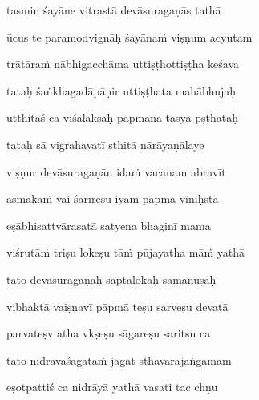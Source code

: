 tasmin śayāne vitrastā devāsuragaṇās tathā\thinspace{\dandab} \dontdisplaylinenum

ūcus te paramodvignāḥ śayāna\.m viṣṇum acyutam \veg\dontdisplaylinenum

trātāra\.m nābhigacchāma uttiṣṭhottiṣṭha keśava\thinspace{\dandab} \dontdisplaylinenum

tataḥ śaṅkhagadāpāṇir uttiṣṭhata mahābhujaḥ \veg\dontdisplaylinenum

utthitaś ca viśālākṣaḥ pāpmanā tasya pṣṭhataḥ\thinspace{\dandab} \dontdisplaylinenum

tataḥ sā vigrahavatī sthitā nārāyaṇālaye \veg\dontdisplaylinenum

viṣṇur devāsuragaṇān ida\.m vacanam abravīt\thinspace{\dandab} \dontdisplaylinenum

asmāka\.m vai śarīreṣu iya\.m pāpmā viniḥstā \veg\dontdisplaylinenum

eṣābhisattvārasatā satyena bhaginī mama\thinspace{\dandab} \dontdisplaylinenum

viśrutā\.m triṣu lokeṣu tā\.m pūjayatha mā\.m yathā \veg\dontdisplaylinenum

tato devāsuragaṇāḥ saptalokāḥ samānuṣāḥ\thinspace{\dandab} \dontdisplaylinenum

vibhaktā vaiṣṇavī pāpmā teṣu sarveṣu devatā \veg\dontdisplaylinenum

parvateṣv atha vkṣeṣu sāgareṣu saritsu ca\thinspace{\dandab} \dontdisplaylinenum

tato nidrāvaśagata\.m jagat sthāvarajaṅgamam \veg\dontdisplaylinenum

eṣotpattiś ca nidrāyā yathā vasati tac chṇu\thinspace{\dandab} \dontdisplaylinenum

